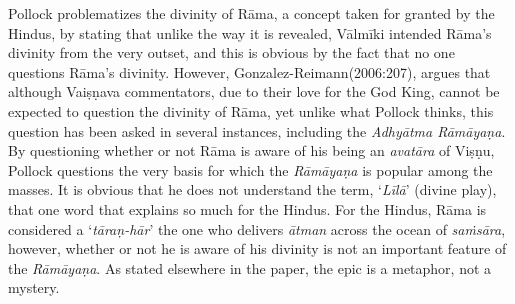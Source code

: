 Pollock problematizes the divinity of Rāma, a concept taken for granted by the Hindus, by stating that unlike the way it is revealed, Vālmīki intended Rāma’s divinity from the very outset, and this is obvious by the fact that no one questions Rāma’s divinity. However, Gonzalez-Reimann(2006:207), argues that although Vaiṣṇava commentators, due to their love for the God King, cannot be expected to question the divinity of Rāma, yet unlike what Pollock thinks, this question has been asked in several instances, including the \textit{Adhyātma Rāmāyaṇa}. By questioning whether or not Rāma is aware of his being an \textit{avatāra} of Viṣṇu, Pollock questions the very basis for which the \textit{Rāmāyaṇa} is popular among the masses. It is obvious that he does not understand the term, ‘\textit{Līlā}’ (divine play), that one word that explains so much for the Hindus. For the Hindus, Rāma is considered a ‘\textit{tāraṇ-hār}’ the one who delivers \textit{ātman} across the ocean of \textit{saṁsāra}, however, whether or not he is aware of his divinity is not an important feature of the \textit{Rāmāyaṇa}. As stated elsewhere in the paper, the epic is a metaphor, not a mystery.

